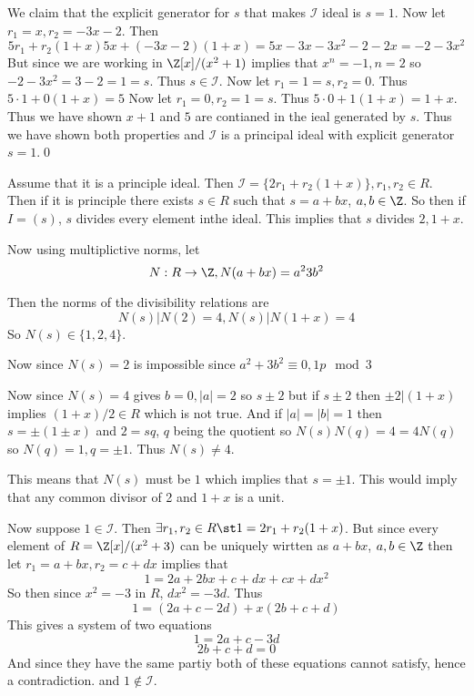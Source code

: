 \documentclass[12pt]{amsart}
\begin{document}
  \begin{problem}
    \begin{subproblem}
      We claim that the explicit generator for $s$ that makes  $\mathcal{I}$ ideal is $s=1$.
      Now let $r_1=x, r_2=-3x-2$. Then 
      \[5r_1+r_2(1+x) 5x + (-3x-2)(1+x) = 5x -3x-3x^2-2-2x = -2-3x^2\]
      But since we are working in $\Z[x]/(x^2+1)$ implies that $x^n=-1, n=2$ so $-2-3x^2 = 3-2 =1 = s$. Thus $s\in \mathcal{I}$.
      Now let $r_1=1=s, r_2 = 0$. Thus $5\cdot1 + 0(1+x) = 5$ Now let $r_1=0,r_2=1=s$. Thus $5\cdot0+1(1+x) = 1+x$. Thus we have shown $x+1$ and $5$ are contianed in the ieal generated by $s$. Thus we have shown both properties and $\mathcal{I}$ is a principal ideal with explicit generator $s=1$.\qed
    \end{subproblem}
    \begin{subproblem}
      Assume that it is a principle ideal. Then $\mathcal{I} = \{2r_1 + r_2(1+x)\}, r_1,r_2\in R$. Then if it is principle there exists $s\in R$ such that $s = a+bx$, $a,b\in \Z$. So then if $I=(s)$, $s$ divides every element inthe ideal. This implies that $s$ divides $2, 1+x$. 

      Now using multiplictive norms, let 
      \[N:R\to \Z, N(a+bx)=a^2 3b^2\]

      Then the norms of the divisibility relations are  
      \[N(s)|N(2)=4, N(s)|N(1+x)=4\]
      So $N(s)\in \{1,2,4\}$.

      Now since $N(s)=2$ is impossible since $a^2+3b^2\equiv 0,1 p\mod 3$ 

      Now since $N(s)=4$ gives $b=0, |a|=2$ so $s\pm 2$ but if $s\pm 2$ then $\pm2|(1+x)$ implies $(1+x)/2 \in R$ which is not true. And if $|a|=|b|=1$ then $s=\pm (1\pm x)$ and $2=sq$, $q$ being the quotient so $N(s)N(q) = 4 = 4N(q)$ so $N(q)=1,q=\pm 1$. Thus $N(s)\neq 4$.

      This means that $N(s)$ must be $1$ which implies that $s=\pm 1$. This would imply that any common divisor of 2 and $1+x$ is a unit. 

      Now suppose $1\in \mathcal{I}$. 
      Then $\exists r_1,r_2\in R \st 1=2r_1+r_2(1+x)$. But since every element of $R=\Z[x]/(x^2+3)$ can be uniquely wirtten 
      as $a+bx$, $a,b\in \Z$ then let $r_1=a+bx, r_2 = c+dx$ implies that 
      \[1 = 2a+2bx+c+dx+cx+dx^2\]
      So then since $x^2=-3$ in $R$, $dx^2=-3d$. Thus 
      \[1 = (2a+c-2d) + x(2b+c+d)\]
      This gives a system of two equations  
      \[1=2a+c-3d\]
      \[2b+c+d=0\]
      And since they have the same partiy both of these equations cannot satisfy, hence a contradiction. and $1\notin \mathcal{I}$.


\end{subproblem}
\end{problem}
\end{document}
